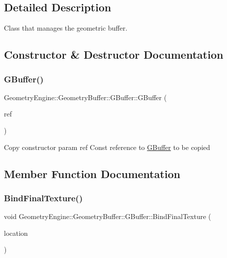 \subsection{Detailed Description}
Class that manages the geometric buffer. 

\subsection{Constructor \& Destructor Documentation}
\mbox{\label{class_geometry_engine_1_1_geometry_buffer_1_1_g_buffer_a9b44aaba6f5e1ef02cdc8ab821d560bb}} 
\subsubsection{\texorpdfstring{GBuffer()}{GBuffer()}}
{\footnotesize\ttfamily Geometry\+Engine\+::\+Geometry\+Buffer\+::\+G\+Buffer\+::\+G\+Buffer (\begin{DoxyParamCaption}\item[{const \mbox{\hyperlink{class_geometry_engine_1_1_geometry_buffer_1_1_g_buffer}{G\+Buffer}} \&}]{ref }\end{DoxyParamCaption})}

Copy constructor param ref Const reference to \mbox{\hyperlink{class_geometry_engine_1_1_geometry_buffer_1_1_g_buffer}{G\+Buffer}} to be copied 

\subsection{Member Function Documentation}
\mbox{\label{class_geometry_engine_1_1_geometry_buffer_1_1_g_buffer_ad64fb7191a7dc256b1282a7f1deab756}} 
\subsubsection{\texorpdfstring{BindFinalTexture()}{BindFinalTexture()}\hspace{0.1cm}{\footnotesize\ttfamily [1/2]}}
{\footnotesize\ttfamily void Geometry\+Engine\+::\+Geometry\+Buffer\+::\+G\+Buffer\+::\+Bind\+Final\+Texture (\begin{DoxyParamCaption}\item[{\mbox{\hyperlink{class_geometry_engine_1_1_geometry_buffer_1_1_g_buffer_a718dceafcac1915f7de061108597e1cc}{G\+B\+U\+F\+F\+E\+R\+\_\+\+T\+E\+X\+T\+U\+R\+E\+\_\+\+T\+Y\+PE}}}]{location }\end{DoxyParamCaption})}

